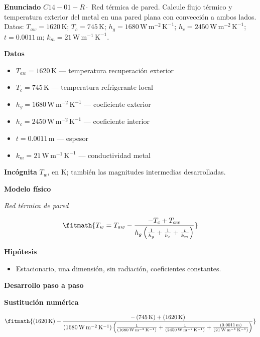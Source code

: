\documentclass[10pt,openany]{book}
\begin{document}
\begin{tcolorbox}[title={Problema resuelto 1}, studiumworked, breakable]

\noindent\textbf{Enunciado}
\(C14-01-R \cdot\) Red térmica de pared. Calcule flujo térmico y temperatura exterior del metal en una pared plana con convección a ambos lados. Datos: \(T_{aw}=1620\, \mathrm{K}\); \(T_c=745\, \mathrm{K}\); \(h_g=1680\, \mathrm{W}\,\mathrm{m}^{-2}\,\mathrm{K}^{-1}\); \(h_c=2450\, \mathrm{W}\,\mathrm{m}^{-2}\,\mathrm{K}^{-1}\); \(t=0.0011\, \mathrm{m}\); \(k_m=21\, \mathrm{W}\,\mathrm{m}^{-1}\,\mathrm{K}^{-1}\).

\noindent\textbf{Datos}
\begin{itemize}
\item $T_{aw} = 1620\,\mathrm{K}$ — temperatura recuperación exterior
\item $T_c = 745\,\mathrm{K}$ — temperatura refrigerante local
\item $h_g = 1680\,\mathrm{W}\,\mathrm{m}^{-2}\,\mathrm{K}^{-1}$ — coeficiente exterior
\item $h_c = 2450\,\mathrm{W}\,\mathrm{m}^{-2}\,\mathrm{K}^{-1}$ — coeficiente interior
\item $t = 0.0011\,\mathrm{m}$ — espesor
\item $k_m = 21\,\mathrm{W}\,\mathrm{m}^{-1}\,\mathrm{K}^{-1}$ — conductividad metal
\end{itemize}

\noindent\textbf{Incógnita}
$T_w$, en $\mathrm{K}$; también las magnitudes intermedias desarrolladas.

\noindent\textbf{Modelo físico}

\noindent\textit{Red térmica de pared}

\[
\fitmath{T_w=T_{aw} - \frac{- T_c + T_{aw}}{h_g \left(\frac{1}{h_g} + \frac{1}{h_c} + \frac{t}{k_m}\right)}}
\]

\noindent\textbf{Hipótesis}
\begin{itemize}
\item Estacionario, una dimensión, sin radiación, coeficientes constantes.
\end{itemize}

\noindent\textbf{Desarrollo paso a paso}



\noindent\textbf{Sustitución numérica}

\[
\fitmath{\left(1620\,\mathrm{K}\right) - \frac{- \left(745\,\mathrm{K}\right) + \left(1620\,\mathrm{K}\right)}{\left(1680\,\mathrm{W}\,\mathrm{m}^{-2}\,\mathrm{K}^{-1}\right) \left(\frac{1}{\left(1680\,\mathrm{W}\,\mathrm{m}^{-2}\,\mathrm{K}^{-1}\right)} + \frac{1}{\left(2450\,\mathrm{W}\,\mathrm{m}^{-2}\,\mathrm{K}^{-1}\right)} + \frac{\left(0.0011\,\mathrm{m}\right)}{\left(21\,\mathrm{W}\,\mathrm{m}^{-1}\,\mathrm{K}^{-1}\right)}\right)}}
\]


\end{tcolorbox}
\end{document}

